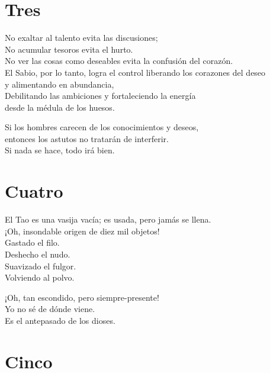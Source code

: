 \documentclass[book,b5paper,hidelinks,final]{memoir}
\begin{document}
	\chapter*{Tres}
	
	No exaltar al talento evita las discusiones;\\
	No acumular tesoros evita el hurto.\\
	No ver las cosas como deseables evita la confusión del corazón.\\
	El Sabio, por lo tanto, logra el control liberando los corazones del
	deseo\\
	y alimentando en abundancia,\\
	Debilitando las ambiciones y fortaleciendo la energía\\
	desde la médula de los huesos.
	
	Si los hombres carecen de los conocimientos y deseos,\\
	entonces los astutos no tratarán de interferir.\\
	Si nada se hace, todo irá bien.
	
	\chapter*{Cuatro}
	
	El Tao es una vasija vacía; es usada, pero jamás se llena.\\
	¡Oh, insondable origen de diez mil objetos!\\
	Gastado el filo.\\
	Deshecho el nudo.\\
	Suavizado el fulgor.\\
	Volviendo al polvo.
	
	¡Oh, tan escondido, pero siempre-presente!\\
	Yo no sé de dónde viene.\\
	Es el antepasado de los dioses.
	
	\chapter*{Cinco}
	
\end{document}
